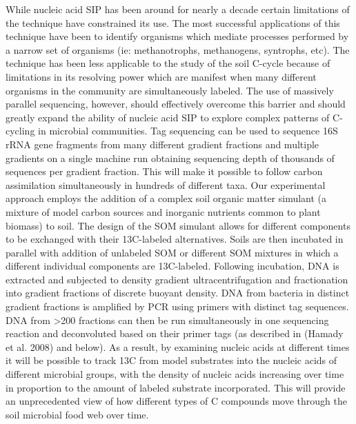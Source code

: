 While nucleic acid SIP has been around for nearly a decade certain limitations of the technique have constrained its use. The most successful applications of this technique have been to identify organisms which mediate processes performed by a narrow set of organisms (ie: methanotrophs, methanogens, syntrophs, etc). The technique has been less applicable to the study of the soil C-cycle because of limitations in its resolving power which are manifest when many different organisms in the community are simultaneously labeled. The use of massively parallel sequencing, however, should effectively overcome this barrier and should greatly expand the ability of nucleic acid SIP to explore complex patterns of C-cycling in microbial communities. Tag sequencing can be used to sequence 16S rRNA gene fragments from many different gradient fractions and multiple gradients on a single machine run obtaining sequencing depth of thousands of sequences per gradient fraction. This will make it possible to follow carbon assimilation simultaneously in hundreds of different taxa.
Our experimental approach employs the addition of a complex soil organic matter simulant (a mixture of model carbon sources and inorganic nutrients common to plant biomass) to soil. The design of the SOM simulant allows for different components to be exchanged with their 13C-labeled alternatives. Soils are then incubated in parallel with addition of unlabeled SOM or different SOM mixtures in which a different individual components are 13C-labeled. Following incubation, DNA is extracted and subjected to density gradient ultracentrifugation and fractionation into gradient fractions of discrete buoyant density. DNA from bacteria in distinct gradient fractions is amplified by PCR using primers with distinct tag sequences. DNA from >200 fractions can then be run simultaneously in one sequencing reaction and deconvoluted based on their primer tags (as described in (Hamady et al. 2008) and below). As a result, by examining nucleic acids at different times it will be possible to track 13C from model substrates into the nucleic acids of different microbial groups, with the density of nucleic acids increasing over time in proportion to the amount of labeled substrate incorporated. This will provide an unprecedented view of how different types of C compounds move through the soil microbial food web over time.

